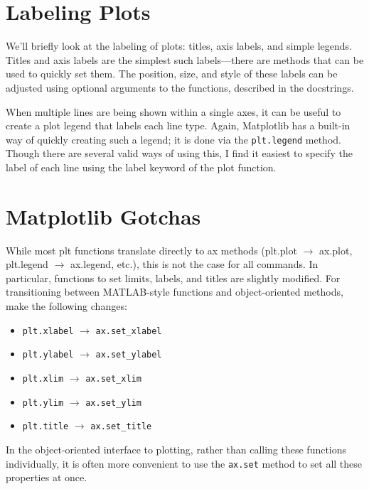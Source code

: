 \section{Labeling Plots}
We'll briefly look at the labeling of plots: titles, axis
labels, and simple legends. Titles and axis labels are the simplest such labels—there
are methods that can be used to quickly set them. The position, size, and style of these labels can be adjusted using optional arguments
to the functions, described in the docstrings.

When multiple lines are being shown within a single axes, it can be useful to create a
plot legend that labels each line type. Again, Matplotlib has a built-in way of quickly
creating such a legend; it is done via the \verb|plt.legend| method.
Though there are several valid ways of using this, I find it easiest to specify the label
of each line using the label keyword of the plot function.

\section{Matplotlib Gotchas}
While most plt functions translate directly to ax methods (plt.plot $\rightarrow$ ax.plot,
plt.legend $\rightarrow$ ax.legend, etc.), this is not the case for all commands. In particular,
functions to set limits, labels, and titles are slightly modified. For transitioning
between MATLAB-style functions and object-oriented methods, make the following
changes:
\begin{itemize}
    \item \verb|plt.xlabel| $\rightarrow$ \verb|ax.set_xlabel|
    \item \verb|plt.ylabel| $\rightarrow$ \verb|ax.set_ylabel|
    \item \verb|plt.xlim| $\rightarrow$ \verb|ax.set_xlim|
    \item \verb|plt.ylim| $\rightarrow$ \verb|ax.set_ylim|
    \item \verb|plt.title| $\rightarrow$ \verb|ax.set_title|
\end{itemize}

In the object-oriented interface to plotting, rather than calling these functions individually, it is often more convenient to use the \verb|ax.set| method to set all these properties at once.

